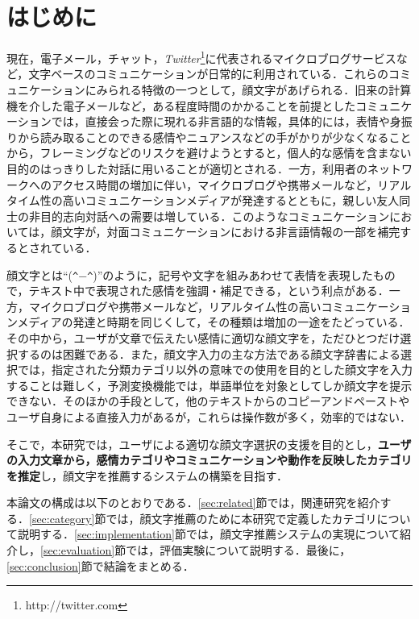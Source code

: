 \documentclass[japanese]{jnlp_1.4}
\begin{document}
\maketitle


\section{はじめに}

現在，電子メール，チャット，{\it Twitter}\footnote{http://twitter.com}に代表されるマイクロブログサービスなど，文字ベースのコミュニケーションが日常的に利用されている．これらのコミュニケーションにみられる特徴の一つとして，顔文字があげられる\cite{ptas2012}．旧来の計算機を介した電子メールなど，ある程度時間のかかることを前提としたコミュニケーションでは，直接会った際に現れる非言語的な情報，具体的には，表情や身振りから読み取ることのできる感情やニュアンスなどの手がかりが少なくなることから，フレーミングなどのリスクを避けようとすると，個人的な感情を含まない目的のはっきりした対話に用いることが適切とされる\cite{derks2007}．一方，利用者のネットワークへのアクセス時間の増加に伴い，マイクロブログや携帯メールなど，リアルタイム性の高いコミュニケーションメディアが発達するとともに，親しい友人同士の非目的志向対話への需要は増している．このようなコミュニケーションにおいては，顔文字が，対面コミュニケーションにおける非言語情報の一部を補完するとされている\cite{derks2007}．

顔文字とは``(\verb|^|−\verb|^|)''のように，記号や文字を組みあわせて表情を表現したもので，テキスト中で表現された感情を強調・補足できる，という利点がある．一方，マイクロブログや携帯メールなど，リアルタイム性の高いコミュニケーションメディアの発達と時期を同じくして，その種類は増加の一途をたどっている．その中から，ユーザが文章で伝えたい感情に適切な顔文字を，ただひとつだけ選択するのは困難である．また，顔文字入力の主な方法である顔文字辞書による選択では，指定された分類カテゴリ以外の意味での使用を目的とした顔文字を入力することは難しく，予測変換機能では，単語単位を対象としてしか顔文字を提示できない．そのほかの手段として，他のテキストからのコピーアンドペーストやユーザ自身による直接入力があるが，これらは操作数が多く，効率的ではない．

そこで，本研究では，ユーザによる適切な顔文字選択の支援を目的とし，{\bf ユーザの入力文章から，感情カテゴリやコミュニケーションや動作を反映したカテゴリを推定}し，顔文字を推薦するシステムの構築を目指す．

本論文の構成は以下のとおりである．\ref{sec:related}節では，関連研究を紹介する．\ref{sec:category}節では，顔文字推薦のために本研究で定義したカテゴリについて説明する．\ref{sec:implementation}節では，顔文字推薦システムの実現について紹介し，\ref{sec:evaluation}節では，評価実験について説明する．最後に，\ref{sec:conclusion}節で結論をまとめる．
\end{document}
